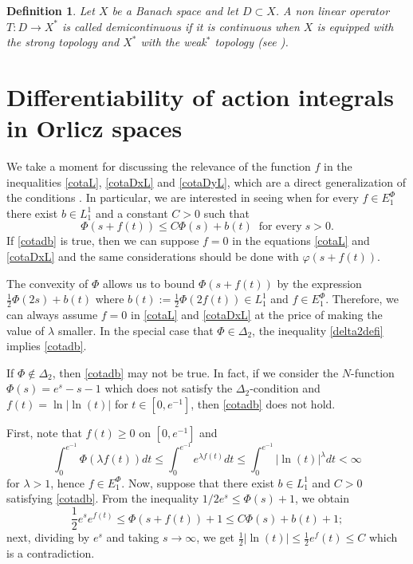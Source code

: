 \documentclass[twoside]{elsarticle}
\newtheorem{defi}[thm]{Definition}
\theoremstyle{remark}
\newcommand{\ephi}{E^{\Phi}}
\renewcommand{\leq}{\leqslant}
\begin{document}
\begin{defi} Let $X$ be a Banach space and let $D\subset X$. A non linear operator $T:D\to X^*$ is called \emph{demicontinuous} if it is continuous when $X$ is equipped with the strong topology and $X^*$ with the weak${}^*$ topology 
(see \cite{kato1964demicontinuity}).
\end{defi} 

\section{Differentiability of action integrals in Orlicz spaces}\label{sec:dif}





We take a moment for  discussing the relevance of the function $f$ in the inequalities \eqref{cotaL},  \eqref{cotaDxL} and \eqref{cotaDyL}, which are a direct  generalization of the conditions \cite[Eq (a), p. 10]{mawhin2010critical}.  In particular, we are interested in seeing when for every  $f\in \ephi_1$ there exist
$b\in L^1_1$ and a constant $C>0$ such that 
\begin{equation}\label{cotadb}
\Phi(s+f(t))\leq C\Phi(s)+b(t)\;\;\mbox{for every}\;s>0.
\end{equation} 
If \eqref{cotadb} is true, then we can suppose $f=0$  in the equations \eqref{cotaL} and \eqref{cotaDxL} and the same considerations should be done with $\varphi\left(s+f(t)\right)$.

 The convexity of $\Phi$ allows us to bound  $\Phi(s+f(t))$ by the expression  $\frac12\Phi(2s)+b(t)$ where $b(t):=\tfrac12\Phi(2f(t))\in L^1_1$ and $f\in \ephi_1$. Therefore, we can always assume $f = 0$ in \eqref{cotaL} and \eqref{cotaDxL} at the price of making  the value of $\lambda$ smaller. In the special case that $\Phi\in\Delta_2$, the inequality \eqref{delta2defi} implies \eqref{cotadb}. 

 If $\Phi\notin\Delta_2$, then \eqref{cotadb}  may not be true.  In fact,  if we consider the $N$-function $\Phi(s)=e^s-s-1$ which does not satisfy the $\Delta_2$-condition and $f(t)=\ln|\ln(t)|$ for $t\in [0,e^{-1}]$, then \eqref{cotadb} does not hold.  

First, note that $f(t)\geq 0$ on $[0,e^{-1}]$ and 
\[\int_0^{e^{-1}}\Phi(\lambda f(t))dt\leq 
\int_0^{e^{-1}}e^{\lambda f(t)}dt\leq \int_0^{e^{-1}}|\ln(t)|^{\lambda}dt<\infty\]
for $\lambda>1$, hence $f\in\ephi_1$. 
Now, suppose that there exist $b\in L^1_1$ and $C>0$ satisfying \eqref{cotadb}. 
From the inequality $1/2e^s\leq \Phi(s)+1$, we obtain
\[\frac12 e^se^{f(t)}\leq \Phi(s+f(t))+1\leq C\Phi(s)+b(t)+1;\]
next, dividing by $e^s$ and taking $s\to\infty$, we get $\tfrac12|\ln(t)|\leq\tfrac12 e^f(t)\leq C$ which is a contradiction. 
\end{document}
